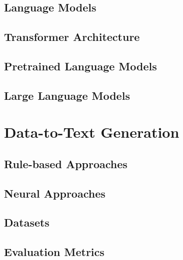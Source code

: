 \subsection{Language Models}
\label{sec:lm-basics}
\subsection{Transformer Architecture}
\label{sec:transformer}
\subsection{Pretrained Language Models}
\label{sec:plms}
\subsection{Large Language Models}
\label{sec:llms}
\section{Data-to-Text Generation}
\label{sec:d2t}
\subsection{Rule-based Approaches}
\label{sec:rule-d2t}
\subsection{Neural Approaches}
\label{sec:neural-d2t}
\subsection{Datasets}
\label{sec:datasets}
\subsection{Evaluation Metrics}
\label{sec:evaluation}